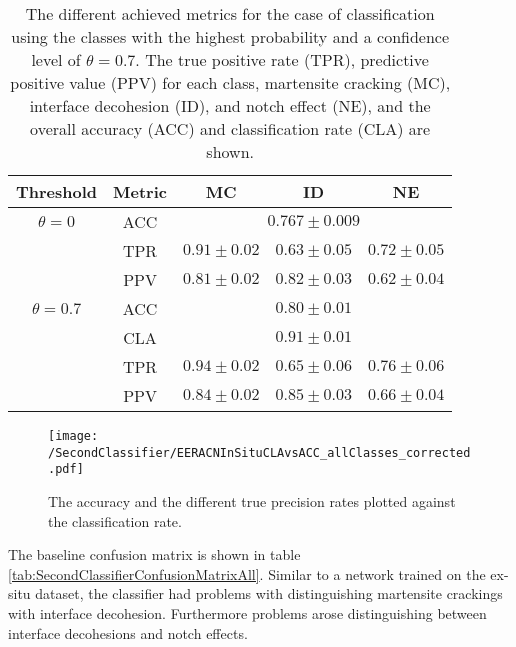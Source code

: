 \begin{table}[H]
 \begin{center}
  \begin{tabular}{@{} *5c @{}} \toprule[2pt]
   Threshold & Metric &  MC & ID & NE \\ \midrule
   $\theta=0$ & ACC & \multicolumn{3}{c}{$0.767\pm0.009$} \\
   &TPR  & $0.91\pm 0.02$ & $0.63 \pm 0.05 $ & $0.72\pm 0.05$ \\
   &PPV  & $0.81\pm 0.02$ & $0.82\pm 0.03$ & $0.62\pm 0.04$ \\ \midrule
   $\theta=0.7$ & ACC & \multicolumn{3}{c}{ $0.80\pm0.01$} \\
   &CLA  & \multicolumn{3}{c}{ $0.91\pm 0.01$} \\ 
   &TPR  & $0.94\pm 0.02$ & $0.65 \pm 0.06$ & $0.76\pm 0.06$  \\
   &PPV  & $0.84 \pm 0.02$ & $0.85 \pm 0.03$ & $0.66 \pm 0.04$  \\   \bottomrule[2pt]
  \end{tabular}
 \end{center}
 \caption{The different achieved metrics for the case of classification using the classes with the highest probability and a confidence level of $\theta =0.7$. The true positive rate (TPR), predictive positive value (PPV) for each class, martensite cracking (MC), interface decohesion (ID), and notch effect (NE), and the overall accuracy (ACC) and classification rate (CLA) are shown.}
   \label{tab:SecondClassifierMetrics}
\end{table}



\begin{figure}
\centering
\texttt{[image: /SecondClassifier/EERACNInSituCLAvsACC\_allClasses\_corrected.pdf]}
\caption{The accuracy and the different true precision rates plotted against the classification rate.}
\label{fig:SecondClassifierOverallAllClasses}
\end{figure}

The baseline confusion matrix is shown in table \ref{tab:SecondClassifierConfusionMatrixAll}. Similar to a network trained on the ex-situ dataset, the classifier had problems with distinguishing martensite crackings with interface decohesion. Furthermore problems arose distinguishing between interface decohesions and notch effects. \\

